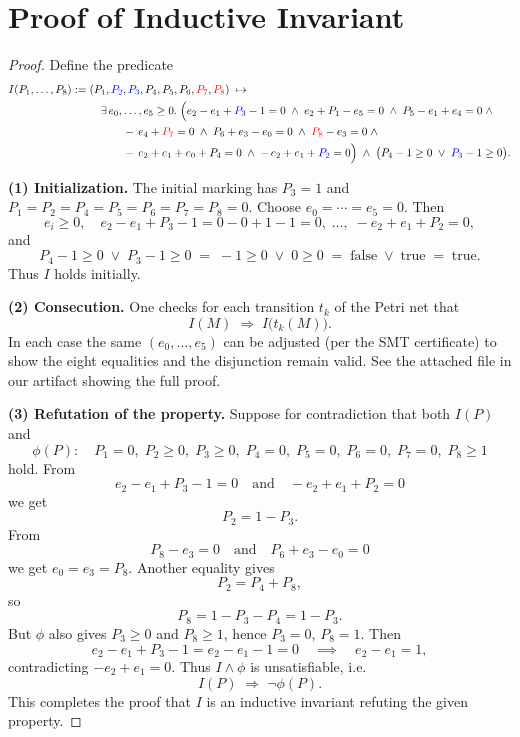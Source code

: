 \appendix

\section{Proof of Inductive Invariant}

\begin{proof}
	
Define the predicate
\[
\begin{aligned}
	I(P_{1},\dots,P_{8})
	:={}&
		(P_{1},\textcolor{blue}{P_{2}},\textcolor{blue}{P_{3}},P_{4},P_{5},P_{6},\textcolor{red}{P_{7}},\textcolor{red}{P_{8}})
		\;\mapsto\;\\
		&\quad
		\exists\,e_{0},\dots,e_{5}\ge0.\;
		\Bigl(
		e_{2}-e_{1}+\textcolor{blue}{P_{3}}-1=0\;\land\;
		e_{2}+P_{1}-e_{5}=0\;\land\;
		P_{5}-e_{1}+e_{4}=0\;\land\\
		&\qquad\quad
		-\,e_{4}+\textcolor{red}{P_{7}}=0\;\land\;
		P_{6}+e_{3}-e_{0}=0\;\land\;
		\textcolor{red}{P_{8}}-e_{3}=0\;\land\\
		&\qquad\quad
		-\,e_{2}+e_{1}+e_{0}+P_{4}=0\;\land\;
		-\,e_{2}+e_{1}+\textcolor{blue}{P_{2}}=0
		\Bigr)
		\;\land\;
		\bigl(P_{4}-1\ge0\;\lor\;\textcolor{blue}{P_{3}}-1\ge0\bigr).
	\end{aligned}
	\]
	
	
	\medskip\noindent
	\textbf{(1) Initialization.}
	The initial marking has $P_{3}=1$ and $P_{1}=P_{2}=P_{4}=P_{5}=P_{6}=P_{7}=P_{8}=0$.
	Choose $e_{0}=\cdots=e_{5}=0$.  Then
	\[
	e_{i}\ge0,\quad
	e_{2}-e_{1}+P_{3}-1=0-0+1-1=0,\;\dots,\;-e_{2}+e_{1}+P_{2}=0,
	\]
	and 
	\[
	P_{4}-1\ge0\;\lor\;P_{3}-1\ge0
	\;=\;-1\ge0\;\lor\;0\ge0
	\;=\;\text{false}\;\lor\;\text{true}
	\;=\;\text{true}.
	\]
	Thus $I$ holds initially.
	
	\medskip\noindent
	\textbf{(2) Consecution.}
	One checks for each transition $t_{k}$ of the Petri net that
	\[
	I(M)\;\Longrightarrow\;I\bigl(t_{k}(M)\bigr).
	\]
	In each case the same $(e_{0},\dots,e_{5})$ can be adjusted (per the SMT certificate) to show the eight equalities and the disjunction remain valid. See the attached file in our artifact showing the full proof.
	
	\medskip\noindent
	\textbf{(3) Refutation of the property.}
	Suppose for contradiction that both $I(P)$ and
	\[
	\phi(P):\quad
	P_{1}=0,\;
	P_{2}\ge0,\;
	P_{3}\ge0,\;
	P_{4}=0,\;
	P_{5}=0,\;
	P_{6}=0,\;
	P_{7}=0,\;
	P_{8}\ge1
	\]
	hold.  From
	\[
	e_{2}-e_{1}+P_{3}-1=0
	\quad\text{and}\quad
	-e_{2}+e_{1}+P_{2}=0
	\]
	we get
	\[
	P_{2}=1-P_{3}.
	\]
	From
	\[
	P_{8}-e_{3}=0
	\quad\text{and}\quad
	P_{6}+e_{3}-e_{0}=0
	\]
	we get $e_{0}=e_{3}=P_{8}$.  Another equality gives
	\[
	P_{2}=P_{4}+P_{8},
	\]
	so
	\[
	P_{8}=1-P_{3}-P_{4}=1-P_{3}.
	\]
	But $\phi$ also gives $P_{3}\ge0$ and $P_{8}\ge1$, hence $P_{3}=0$, $P_{8}=1$.  Then
	\[
	e_{2}-e_{1}+P_{3}-1=e_{2}-e_{1}-1=0
	\quad\implies\quad
	e_{2}-e_{1}=1,
	\]
	contradicting $-e_{2}+e_{1}=0$.  Thus $I\land\phi$ is unsatisfiable, i.e.\ 
	\[
	I(P)\;\Longrightarrow\;\neg\phi(P).
	\]
	This completes the proof that $I$ is an inductive invariant refuting the given property.
\end{proof}


\newpage